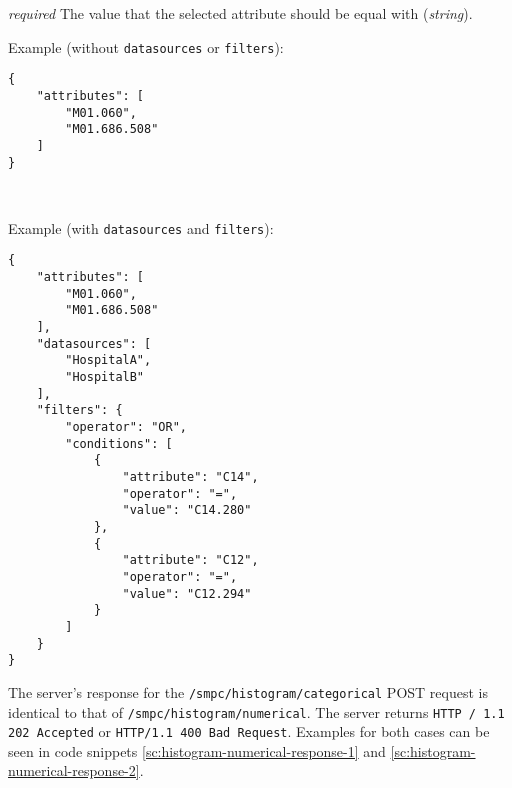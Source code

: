 \begin{description}[labelwidth=5em, leftmargin=\dimexpr\labelwidth+\labelsep\relax]
\begin{description}[labelwidth=6em, leftmargin=\dimexpr\labelwidth+\labelsep\relax]
\begin{description}[labelwidth=6em, leftmargin=\dimexpr\labelwidth+\labelsep\relax]
\begin{description}[labelwidth=5em, leftmargin=\dimexpr\labelwidth+\labelsep\relax]
            \item[\texttt{value}:] {\color{red}\textit{required}} The value that the selected attribute should be equal with (\textit{string}).
        \end{description}

    \end{description}
\end{description}

\begin{minipage}{\linewidth}
  Example (without \texttt{datasources} or \texttt{filters}):
{
\begin{verbatim}
{
    "attributes": [
        "M01.060",
        "M01.686.508"
    ]
}
\end{verbatim}
\label{sc:histogram-categorical-post-1}
}
\end{minipage}

\ \\
\begin{minipage}{\linewidth}
  Example (with \texttt{datasources} and \texttt{filters}):
{
\begin{verbatim}
{
    "attributes": [
        "M01.060",
        "M01.686.508"
    ],
    "datasources": [
        "HospitalA",
        "HospitalB"
    ],
    "filters": {
        "operator": "OR",
        "conditions": [
            {
                "attribute": "C14",
                "operator": "=",
                "value": "C14.280"
            },
            {
                "attribute": "C12",
                "operator": "=",
                "value": "C12.294"
            }
        ]
    }
}
\end{verbatim}
\label{sc:histogram-categorical-post-2}
}
\end{minipage}

\item[Response:] The server's response for the \texttt{/smpc/histogram/categorical} POST request is identical to that of \texttt{/smpc/histogram/numerical}. The server returns \texttt{HTTP / 1.1 202 Accepted} or \texttt{HTTP/1.1 400 Bad Request}. Examples for both cases can be seen in code snippets \ref{sc:histogram-numerical-response-1} and \ref{sc:histogram-numerical-response-2}.
 \end{description}



